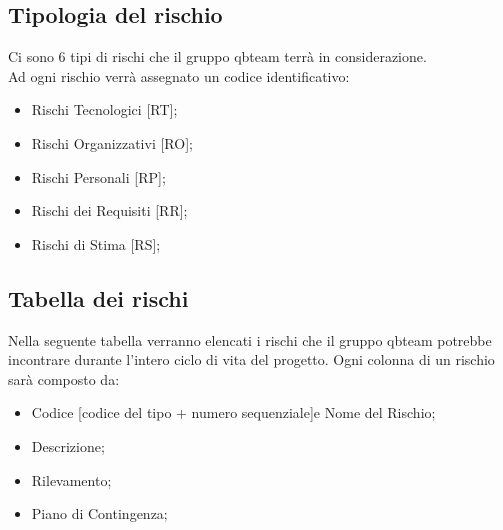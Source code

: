 \subsection{Tipologia del rischio}
Ci sono 6 tipi di rischi che il gruppo qbteam terrà in considerazione. 
\\Ad ogni rischio verrà assegnato un codice identificativo:
\begin{itemize}
	\item Rischi Tecnologici [RT];
	\item Rischi Organizzativi [RO];
	\item Rischi Personali [RP];
	\item Rischi dei Requisiti [RR];
	\item Rischi di Stima [RS];
\end{itemize}

\subsection{Tabella dei rischi}
Nella seguente tabella verranno elencati i rischi che il gruppo qbteam potrebbe incontrare durante l'intero ciclo di vita del progetto.
Ogni colonna di un rischio sarà composto da:
\begin{itemize}
	\item Codice [codice del tipo + numero sequenziale]e Nome del Rischio;
	\item Descrizione;
	\item Rilevamento;
	\item Piano di Contingenza;
\end{itemize}


